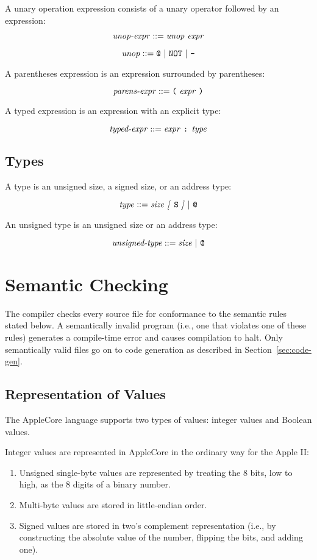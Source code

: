 \documentclass[10pt]{article}
\begin{document}
 A unary operation expression
consists of a unary operator followed by an expression:

$$\mbox{\textit{unop-expr}} ::= \mbox{\ensuremath{\mbox{\textit{unop}}} \ensuremath{\mbox{\textit{expr}}}}$$

$$\mbox{\textit{unop}} ::= \mbox{\texttt{@} $|$ \texttt{NOT} $|$ \texttt{-}}$$

 A parentheses expression is an
expression surrounded by parentheses:

$$\mbox{\textit{parens-expr}} ::= \mbox{\texttt{(} \ensuremath{\mbox{\textit{expr}}} \texttt{)}}$$

 A typed expression is an expression with
an explicit type:

$$\mbox{\textit{typed-expr}} ::= \mbox{\ensuremath{\mbox{\textit{expr}}} \texttt{:}
  \ensuremath{\mbox{\textit{type}}}}$$

\subsection{Types}

A type is an unsigned size, a signed size, or an address type:

$$\mbox{\textit{type}} ::= \mbox{\ensuremath{\mbox{\textit{size}}} \textit{[} \texttt{S} \textit{]} $|$ \texttt{@}}$$

 An unsigned type is an unsigned size or an
address type:

$$\mbox{\textit{unsigned-type}} ::= \mbox{\ensuremath{\mbox{\textit{size}}} $|$ \texttt{@}}$$


\section{Semantic Checking}
\label{sec:semantics}

The compiler checks every source file for conformance to the semantic
rules stated below.  A semantically invalid program (i.e., one that
violates one of these rules) generates a compile-time error and causes
compilation to halt.  Only semantically valid files go on to code
generation as described in Section~\ref{sec:code-gen}.

\subsection{Representation of Values}
\label{sec:semantics:values}

The AppleCore language supports two types of values: integer values
and Boolean values.

 Integer values are represented in AppleCore
in the ordinary way for the Apple II:
%
\begin{enumerate}
%
\item Unsigned single-byte values are represented by treating the 8
  bits, low to high, as the 8 digits of a binary number.
%
\item Multi-byte values are stored in little-endian order.
%
\item Signed values are stored in two's complement representation
  (i.e., by constructing the absolute value of the number, flipping
  the bits, and adding one).
%
\end{enumerate}
\end{document}
